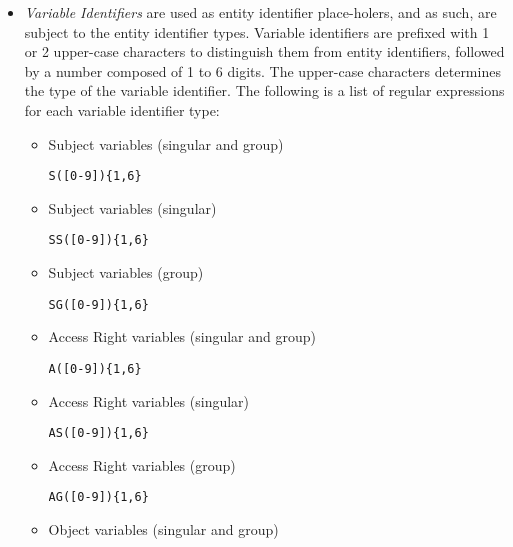 \documentclass[10pt, twocolumn]{article}
\begin{document}
\begin{itemize}
              \begin{verbatim}[a-z]([a-zA-Z0-9_]{0,127}\end{verbatim}
 
            \item
              {\em Variable Identifiers} are used as entity identifier
              place-holers, and as such, are subject to the entity identifier
              types. Variable identifiers are prefixed with 1 or 2 upper-case
              characters to distinguish them from entity identifiers, followed
              by a number composed of 1 to 6 digits. The upper-case characters
              determines the type of the variable identifier. The following is
              a list of regular expressions for each variable identifier type:

              \begin{itemize}
                \item
                  Subject variables (singular and group)

                  \begin{verbatim}S([0-9]){1,6}\end{verbatim}
                \item
                  Subject variables (singular)

                  \begin{verbatim}SS([0-9]){1,6}\end{verbatim}
                \item
                  Subject variables (group)

                  \begin{verbatim}SG([0-9]){1,6}\end{verbatim}
                \item
                  Access Right variables (singular and group)

                  \begin{verbatim}A([0-9]){1,6}\end{verbatim}
                \item
                  Access Right variables (singular)

                  \begin{verbatim}AS([0-9]){1,6}\end{verbatim}
                \item
                  Access Right variables (group)

                  \begin{verbatim}AG([0-9]){1,6}\end{verbatim}
                \item
                  Object variables (singular and group)


\end{itemize}
\end{itemize}
\end{document}

